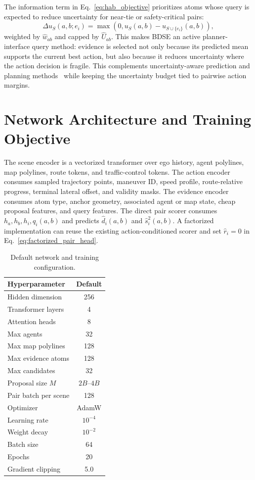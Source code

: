 \documentclass{article}
\begin{document}
The information term in Eq.~\eqref{eq:hab_objective} prioritizes atoms whose query is expected to reduce uncertainty for near-tie or safety-critical pairs:
\begin{equation}
    \Delta u_S(a,b;e_i)=
    \max\!\left(0,u_S(a,b)-u_{S\cup\{e_i\}}(a,b)\right),
\end{equation}
weighted by $\hat w_{ab}$ and capped by $\hat U_{ab}$. This makes BDSE an active planner-interface query method: evidence is selected not only because its predicted mean supports the current best action, but also because it reduces uncertainty where the action decision is fragile. This complements uncertainty-aware prediction and planning methods~\cite{shao2024uncertainty,nair2024predictive,yang2025uncad} while keeping the uncertainty budget tied to pairwise action margins.

\section{Network Architecture and Training Objective}
\label{app:network}

The scene encoder is a vectorized transformer over ego history, agent polylines, map polylines, route tokens, and traffic-control tokens. The action encoder consumes sampled trajectory points, maneuver ID, speed profile, route-relative progress, terminal lateral offset, and validity masks. The evidence encoder consumes atom type, anchor geometry, associated agent or map state, cheap proposal features, and query features. The direct pair scorer consumes $h_a,h_b,h_i,q_i(a,b)$ and predicts $\hat d_i(a,b)$ and $\hat s_i^2(a,b)$. A factorized implementation can reuse the existing action-conditioned scorer and set $\hat r_i=0$ in Eq.~\eqref{eq:factorized_pair_head}.

\begin{table}[h]
\centering
\caption{Default network and training configuration.}
\label{tab:network_config}
\begin{tabular}{lc}
\toprule
Hyperparameter & Default \\
\midrule
Hidden dimension & 256 \\
Transformer layers & 4 \\
Attention heads & 8 \\
Max agents & 32 \\
Max map polylines & 128 \\
Max evidence atoms & 128 \\
Max candidates & 32 \\
Proposal size $M$ & $2B$--$4B$ \\
Pair batch per scene & 128 \\
Optimizer & AdamW \\
Learning rate & $10^{-4}$ \\
Weight decay & $10^{-2}$ \\
Batch size & 64 \\
Epochs & 20 \\
Gradient clipping & 5.0 \\
\bottomrule
\end{tabular}
\end{table}
\end{document}

